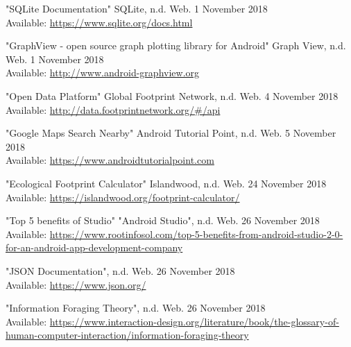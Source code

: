 \documentclass[onecolumn, draftclsnofoot,10pt, compsoc, tikz]{IEEEtran}
\begin{document}
\clearpage
\begin{thebibliography}{10}
"SQLite Documentation" SQLite, n.d. Web. 1 November 2018 \\
Available: \url{https://www.sqlite.org/docs.html}

"GraphView - open source graph plotting library for Android" Graph View, n.d. Web. 1 November 2018 \\
Available: \url{http://www.android-graphview.org}

"Open Data Platform" Global Footprint Network, n.d. Web. 4 November 2018 \\
Available: \url{http://data.footprintnetwork.org/#/api}

"Google Maps Search Nearby" Android Tutorial Point, n.d. Web. 5 November 2018 \\
Available: \url{https://www.androidtutorialpoint.com}

"Ecological Footprint Calculator" Islandwood, n.d. Web. 24 November 2018 \\
Available: \url{https://islandwood.org/footprint-calculator/}

"Top 5 benefits of Studio" "Android Studio", n.d. Web. 26 November 2018 \\
Available: \url{https://www.rootinfosol.com/top-5-benefits-from-android-studio-2-0-for-an-android-app-development-company}

"JSON Documentation", n.d. Web. 26 November 2018 \\
Available: \url{https://www.json.org/}

"Information Foraging Theory", n.d. Web. 26 November 2018 \\
Available: \url{https://www.interaction-design.org/literature/book/the-glossary-of-human-computer-interaction/information-foraging-theory}

\end{thebibliography}
\end{document}
